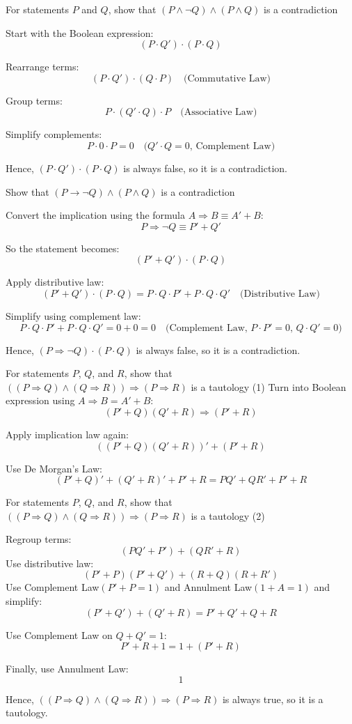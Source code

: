 \documentclass{beamer}
\begin{document}
\begin{frame}{For statements $P$ and $Q$, show that $(P \wedge \neg Q) \wedge (P \wedge Q)$ is a contradiction}

Start with the Boolean expression:  
\[
(P \cdot Q') \cdot (P \cdot Q)
\]

Rearrange terms:  
\[
(P \cdot Q') \cdot (Q \cdot P) \quad \text{(Commutative Law)}
\]

Group terms:  
\[
P \cdot (Q' \cdot Q) \cdot P \quad \text{(Associative Law)}
\]

Simplify complements:  
\[
P \cdot 0 \cdot P = 0 \quad \text{($Q' \cdot Q = 0$, Complement Law)}
\]


\alert{Hence, $(P \cdot Q') \cdot (P \cdot Q)$ is always false, so it is a contradiction.}
\end{frame}

\begin{frame}{Show that $(P \rightarrow \neg Q) \wedge (P \wedge Q)$ is a contradiction}

Convert the implication using the formula $A \Rightarrow B \equiv A' + B$:  
\[
P \Rightarrow \neg Q \equiv P' + Q'
\]

So the statement becomes:  
\[
(P' + Q') \cdot (P \cdot Q)
\]

Apply distributive law:  
\[
(P' + Q') \cdot (P \cdot Q) = P \cdot Q \cdot P' + P \cdot Q \cdot Q' \quad \text{(Distributive Law)}
\]

Simplify using complement law:  
\[
P \cdot Q \cdot P' + P \cdot Q \cdot Q' = 0 + 0 = 0 \quad \text{(Complement Law, $P \cdot P' = 0$, $Q \cdot Q' = 0$)}
\]

\alert{Hence, $(P \Rightarrow \neg Q) \cdot (P \cdot Q)$ is always false, so it is a contradiction.}
\end{frame}

\begin{frame}{For statements $P$, $Q$, and $R$, show that $((P \Rightarrow Q) \wedge (Q \Rightarrow R)) \Rightarrow (P \Rightarrow R)$ is a tautology (1)}
Turn into Boolean expression using $A \Rightarrow B = A' + B$:
\[
(P'+Q)(Q'+R) \Rightarrow (P'+R)
\]

Apply implication law again:
\[
((P'+Q)(Q'+R))' + (P'+R)
\]

Use De Morgan's Law:
\[
(P'+Q)' + (Q'+R)' + P' + R = PQ' + QR' + P' + R
\]
\end{frame}

\begin{frame}{For statements $P$, $Q$, and $R$, show that $((P \Rightarrow Q) \wedge (Q \Rightarrow R)) \Rightarrow (P \Rightarrow R)$ is a tautology (2)}

Regroup terms:
\[
(PQ' + P') + (QR' + R)
\]
Use distributive law: 
\[
(P'+P)(P'+Q') + (R+Q)(R+R')
\]
Use Complement Law$(P'+P=1)$ and Annulment Law$(1+A=1)$ and simplify:
\[
(P'+Q') + (Q'+R) = P' + Q' + Q + R
\]

Use Complement Law on $Q+Q'=1$:
\[
P' + R + 1=1+(P'+R)
\]

Finally, use Annulment Law:
\[
1
\]

\alert{Hence, $((P \Rightarrow Q) \wedge (Q \Rightarrow R)) \Rightarrow (P \Rightarrow R)$ is always true, so it is a tautology.}
\end{frame}
\end{document}
